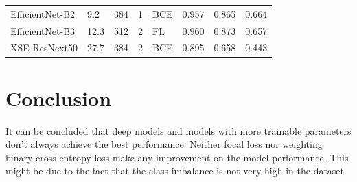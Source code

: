 \documentclass[conference]{IEEEtran}
\begin{document}
\begin{table}[bp]
\begin{center}
\begin{tabular}{lllll|rrr}
EfficientNet-B2       & 9.2      & 384 & 1                    & BCE    & 0.957                                 & 0.865                                  & 0.664                                   \\ 
EfficientNet-B3       & 12.3     & 512 & 2                    & FL     & 0.960                                 & 0.873                                  & 0.657                                   \\ 
XSE-ResNext50         & 27.7     & 384 & 2                    & BCE    & 0.895                                 & 0.658                                  & 0.443                                   \\
\end{tabular}
\label{table:experiment_results}
\end{center}
\end{table}


\section{Conclusion}

It can be concluded that deep models and models with more trainable parameters 
don't always achieve the best performance. Neither focal loss nor weighting 
binary cross entropy loss make any improvement on the model performance. 
This might be due to the fact that the class imbalance is not very high in the dataset.

\clearpage



\end{document}
